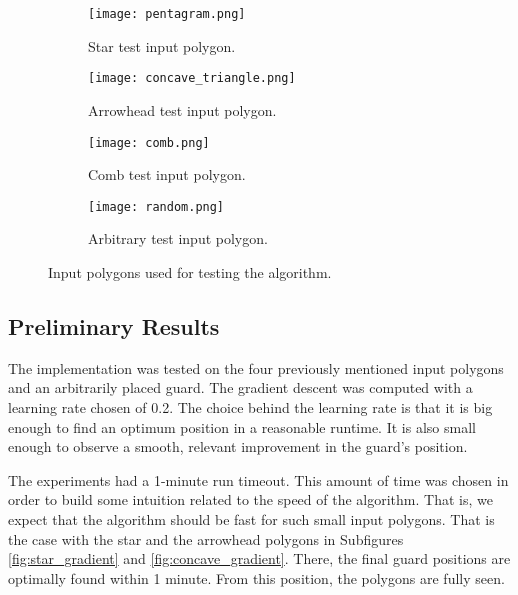 \begin{figure}[h!]
    \centering
    \begin{subfigure}{0.45\textwidth}
        \centering
        \texttt{[image: pentagram.png]}
        \caption{Star test input polygon.}
        \label{fig:star}
    \end{subfigure}
    \begin{subfigure}{0.45\textwidth}
        \centering
        \texttt{[image: concave\_triangle.png]}
        \caption{Arrowhead test input polygon.}
        \label{fig:concave}
    \end{subfigure}
    \begin{subfigure}{0.45\textwidth}
        \centering
        \texttt{[image: comb.png]}
        \caption{Comb test input polygon.}
        \label{fig:comb}
    \end{subfigure}
    \begin{subfigure}{0.45\textwidth}
        \centering
        \texttt{[image: random.png]}
        \caption{Arbitrary test input polygon.}
        \label{fig:random}
    \end{subfigure}
    \caption{Input polygons used for testing the algorithm.}
\end{figure}
\subsection{Preliminary Results}
The implementation was tested on the four previously mentioned input polygons and an arbitrarily placed guard. The gradient descent was computed with a learning rate chosen of 0.2. The choice behind the learning rate is that it is big enough to find an optimum position in a reasonable runtime. It is also small enough to observe a smooth, relevant improvement in the guard's position.

The experiments had a 1-minute run timeout. This amount of time was chosen in order to build some intuition related to the speed of the algorithm. That is, we expect that the algorithm should be fast for such small input polygons. That is the case with the star and the arrowhead polygons in Subfigures \ref{fig:star_gradient} and \ref{fig:concave_gradient}. There, the final guard positions are optimally found within 1 minute. From this position, the polygons are fully seen.

